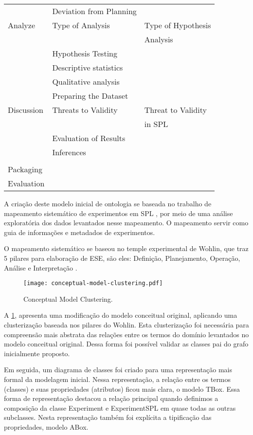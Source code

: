\begin{table}[]
\begin{tabular}{@{}lll@{}}
		& Deviation from Planning &  \\
		Analyze & Type of Analysis & Type of Hypothesis \\ & & Analysis \\
		& Hypothesis Testing &  \\
		& Descriptive statistics &  \\
		& Qualitative analysis &  \\
		& Preparing the Dataset &  \\
		Discussion & Threats to Validity & Threat to Validity \\ & & in SPL \\
		& Evaluation of Results &  \\
		& Inferences &  \\
		&  &  \\
		Packaging &  &  \\
		Evaluation &  &  \\ \bottomrule
	\end{tabular}
\end{table}

A criação deste modelo inicial de ontologia se baseada no trabalho de mapeamento sistemático de experimentos em SPL \cite{Furtado2018}, por meio de uma análise exploratória dos dados levantados nesse mapeamento. O mapeamento servir como guia de informações e metadados de experimentos.

O mapeamento sistemático se baseou no temple experimental de Wohlin, que traz 5 pilares para elaboração de ESE, são eles: Definição, Planejamento, Operação, Análise e Interpretação \cite{wohlin2012}.

\begin{figure}[htb]
	\centering 
	\texttt{[image: conceptual-model-clustering.pdf]}
	\caption{Conceptual Model Clustering.}
	\label{figure:conceptual_model_clustering}
\end{figure}

A \ref{figure:conceptual_model_clustering}, apresenta uma modificação do modelo conceitual original, aplicando uma clusterização baseada nos pilares do Wohlin. Esta clusterização foi necessária para compreensão mais abstrata das relações entre os termos do domínio levantados no modelo conceitual original. Dessa forma foi possível validar as classes pai do grafo inicialmente proposto.
	
Em seguida, um diagrama de classes foi criado para uma representação mais formal da modelagem inicial. Nessa representação, a relação entre os termos (classes) e suas propriedades (atributos) ficou mais clara, o modelo TBox. Essa forma de representação destacou a relação principal quando definimos a composição da classe Experiment e ExperimentSPL em quase todas as outras subclasses. Nesta representação também foi explícita a tipificação das propriedades, modelo ABox.

